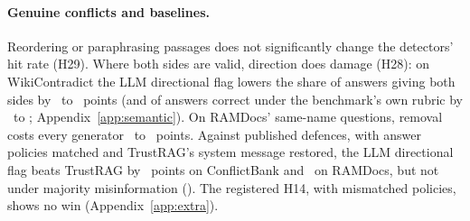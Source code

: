 \paragraph{Genuine conflicts and baselines.} Reordering \citep{liu2024lost} or paraphrasing passages does not significantly
change the detectors' hit rate (H29). Where both sides are valid, direction does damage (H28): on WikiContradict the LLM directional
flag lowers the share of answers giving both sides by \ahTwentyEightWcMiniDir\ to \ahTwentyEightWcLunaDir\ points
(and of answers correct under the benchmark's own rubric by \awikiOrigMiniEffPt\ to \awikiOrigLunaEffPt;
Appendix~\ref{app:semantic}). On RAMDocs' same-name questions, removal costs every generator
\ahTwentyEightAmbMiniRem\ to \ahTwentyEightAmbLunaRem\ points. Against published defences, with answer policies matched and TrustRAG's
system message restored, the LLM directional flag beats TrustRAG by \blHFourteenCbs\ points on ConflictBank and
\blHFourteenRd\ on RAMDocs, but not under majority misinformation (\blHFourteenMj). The registered H14, with
mismatched policies, shows no win (Appendix~\ref{app:extra}).
